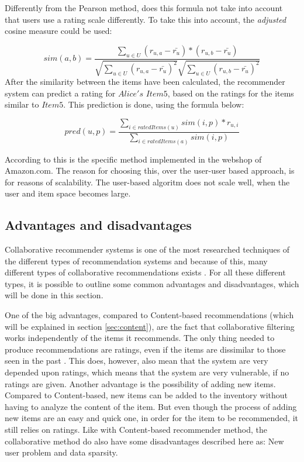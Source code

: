 Differently from the Pearson method, does this formula not take into account that users use a rating scale differently. To take this into account, the \textit{adjusted} cosine measure could be used:

\[
	sim(a,b) = \frac{\sum_{u \in U}(r_{u,a} - \bar{r_{u}})*(r_{u,b} - \bar{r_{u}})}{\sqrt{\sum_{u \in U}(r_{u,a} - \bar{r_{u}})^2}\sqrt{\sum_{u \in U} (r_{u,b} - \bar{r_{u}})^2}}
\]
After the similarity between the items have been calculated, the recommender system can predict a rating for \(Alice's\) \(Item5\), based on the ratings for the items similar to \(Item5\). This prediction is done, using the formula below:

\[
	pred(u,p) = \frac{\sum_{i\in ratedItems(u)} sim(i,p) * r_{u,i}}{\sum_{i \in ratedItems(a)} sim(i,p)}
\]

According to \citet{AmazonRecommendations} this is the specific method implemented in the webshop of Amazon.com. The reason for choosing this, over the user-user based approach, is for reasons of scalability. The user-based algoritm does not scale well, when the user and item space becomes large. 

\subsection{Advantages and disadvantages}
Collaborative recommender systems is one of the most researched techniques of the different types of recommendation systems and because of this, many different types of collaborative recommendations exists \citep{IntroductionRecommenderSystems}. For all these different types, it is possible to outline some common advantages and disadvantages, which will be done in this section.\newline

One of the big advantages, compared to Content-based recommendations (which will be explained in section \ref{sec:content}), are the fact that collaborative filtering works independently of the items it recommends. The only thing needed to produce recommendations are ratings, even if the items are dissimilar to those seen in the past \citep[p. 18]{TowardsTheNextGenerationOfRs}. This does, however, also mean that the system are very depended upon ratings, which means that the system are very vulnerable, if no ratings are given. Another advantage is the possibility of adding new items. Compared to Content-based, new items can be added to the inventory without having to analyze the content of the item. But even though the process of adding new items are an easy and quick one, in order for the item to be recommended, it still relies on ratings.\newline 
Like with Content-based recommender method, the collaborative method do also have some disadvantages described here as: New user problem and data sparsity.\newline

